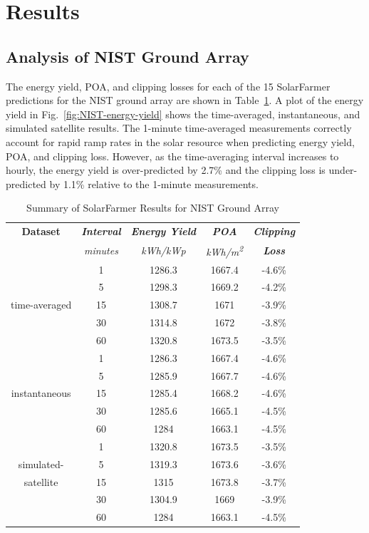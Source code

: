 \documentclass[conference]{IEEEtran}
\begin{document}
\section{Results}
\label{section:results}

\subsection{Analysis of NIST Ground Array}
The energy yield, POA, and clipping losses for each of the 15 SolarFarmer predictions for the NIST ground array are shown in Table~\ref{table:results-summary}. A plot of the energy yield in Fig.~\ref{fig:NIST-energy-yield} shows the time-averaged, instantaneous, and simulated satellite results. The 1-minute time-averaged measurements correctly account for rapid ramp rates in the solar resource when predicting energy yield, POA, and clipping loss. However, as the time-averaging interval increases to hourly, the energy yield is over-predicted by 2.7\% and the clipping loss is under-predicted by 1.1\% relative to the 1-minute measurements.

\begin{table}[htbp]
\caption{Summary of SolarFarmer Results for NIST Ground Array}
\begin{center}
\begin{tabular}{|c|c|c|c|c|}
\hline
\textbf{Dataset} & \textbf{\textit{Interval}}& \textbf{\textit{Energy Yield}}& \textbf{\textit{POA}}& \textbf{\textit{Clipping}} \\
                 & \textit{minutes}& \textit{kWh/kWp}& \textit{kWh/m\textsuperscript{2}}& \textbf{\textit{Loss}} \\
\hline
             &  1& 1286.3& 1667.4& -4.6\% \\
             &  5& 1298.3& 1669.2& -4.2\% \\
time-averaged& 15& 1308.7& 1671  & -3.9\% \\
             & 30& 1314.8& 1672  & -3.8\% \\
             & 60& 1320.8& 1673.5& -3.5\% \\
\hline
             &  1& 1286.3& 1667.4& -4.6\% \\
             &  5& 1285.9& 1667.7& -4.6\% \\
instantaneous& 15& 1285.4& 1668.2& -4.6\% \\
             & 30& 1285.6& 1665.1& -4.5\% \\
             & 60& 1284  & 1663.1& -4.5\% \\
\hline
             &  1& 1320.8& 1673.5& -3.5\% \\
simulated-   &  5& 1319.3& 1673.6& -3.6\% \\
satellite    & 15& 1315  & 1673.8& -3.7\% \\
             & 30& 1304.9& 1669  & -3.9\% \\
             & 60& 1284  & 1663.1& -4.5\% \\
\hline
\end{tabular}
\label{table:results-summary}
\end{center}
\end{table}
\end{document}
